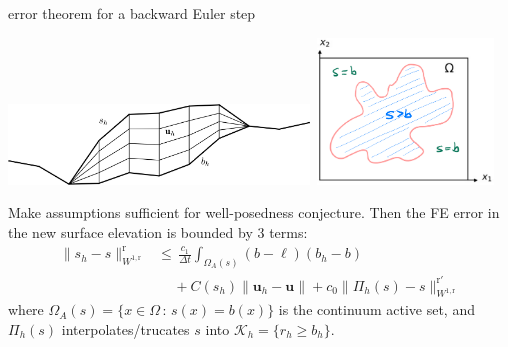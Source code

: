 \documentclass[10pt,dvipsnames]{beamer}
\theoremstyle{theorem}
\newcommand{\bu}{\mathbf{u}}
\newcommand{\cK}{\mathcal{K}}
\newcommand{\rr}{\mathrm{r}}
\begin{document}
\begin{frame}{error theorem for a backward Euler step}

\noindent \mbox{\includegraphics[width=0.6\textwidth]{extruded} \qquad \includegraphics[width=0.35\textwidth]{mapplane}}

\medskip
\begin{theorem}[Bueler, 2024]
Make assumptions sufficient for well-posedness conjecture.  Then the FE error in the new surface elevation is bounded by 3 terms:
\begin{align*}
\|s_h-s\|_{W^{1,\rr}}^\rr &\le \, \frac{c_1}{\Delta t} \int_{\Omega_A(s)} (b - \ell) (b_h - b) \\
   &\quad\, + C(s_h) \big\|\bu_h - \bu\big\| + c_0 \|\Pi_h(s) - s\|_{W^{1,\rr}}^{\rr'}
\end{align*}
where $\Omega_A(s) = \{x\in\Omega\,:\, s(x)=b(x)\}$ is the continuum active set, and $\Pi_h(s)$ interpolates/trucates $s$ into $\cK_h = \{r_h \ge b_h\}$.
\end{theorem}
\end{frame}
\end{document}
